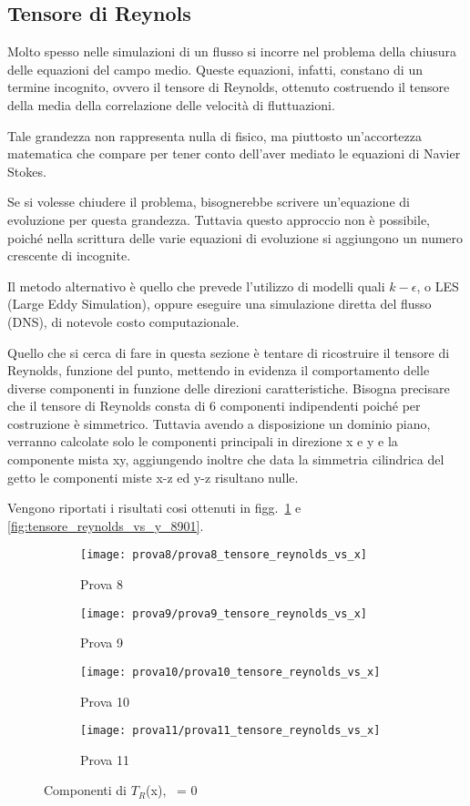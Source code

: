 \documentclass{article} %
\newcommand{\yd}{\nicefrac{\textrm{y}}{\textrm{D}}\ }
\begin{document}
\subsection{Tensore di Reynols}
Molto spesso nelle simulazioni di un flusso si incorre nel problema della chiusura delle equazioni del campo medio. Queste equazioni, infatti, constano di un termine incognito, ovvero il tensore di Reynolds, ottenuto costruendo il tensore della media della correlazione delle velocità di fluttuazioni.\par
Tale grandezza non rappresenta nulla di fisico, ma piuttosto un'accortezza matematica che compare per tener conto dell'aver mediato le equazioni di Navier Stokes.\par
Se si volesse chiudere il problema, bisognerebbe scrivere un'equazione di evoluzione per questa grandezza. Tuttavia questo approccio non è possibile, poiché nella scrittura delle varie equazioni di evoluzione si aggiungono un numero crescente di incognite.\par
Il metodo alternativo è quello che prevede l'utilizzo di modelli quali $k-\epsilon$, o LES (Large Eddy Simulation), oppure eseguire una simulazione diretta del flusso (DNS), di notevole costo computazionale.\par
Quello che si cerca di fare in questa sezione è tentare di ricostruire il tensore di Reynolds, funzione del punto, mettendo in evidenza il comportamento delle diverse componenti in funzione delle direzioni caratteristiche. Bisogna precisare che il tensore di Reynolds consta di 6 componenti indipendenti poiché per costruzione è simmetrico. Tuttavia avendo a disposizione un dominio piano, verranno calcolate solo le componenti principali in direzione x e y e la componente mista xy, aggiungendo inoltre che data la simmetria cilindrica del getto le componenti miste x-z ed y-z risultano nulle.\par
Vengono riportati i risultati cosi ottenuti in figg.~\ref{fig:tensore_reynolds_vs_x_8901} e \ref{fig:tensore_reynolds_vs_y_8901}.
\clearpage
\begin{figure}[h!]
	\centering
	\begin{subfigure}[b]{0.24\textwidth}
		\texttt{[image: prova8/prova8\_tensore\_reynolds\_vs\_x]}
		\caption{Prova 8}
	\end{subfigure}
	\begin{subfigure}[b]{0.24\textwidth}
		\texttt{[image: prova9/prova9\_tensore\_reynolds\_vs\_x]}
		\caption{Prova 9}
	\end{subfigure}
	\begin{subfigure}[b]{0.24\textwidth}
		\texttt{[image: prova10/prova10\_tensore\_reynolds\_vs\_x]}
		\caption{Prova 10}
	\end{subfigure}
	\begin{subfigure}[b]{0.24\textwidth}
		\texttt{[image: prova11/prova11\_tensore\_reynolds\_vs\_x]}
		\caption{Prova 11}
	\end{subfigure}
	\caption{Componenti di $T_R$(x), \yd= 0}
	\label{fig:tensore_reynolds_vs_x_8901}
\end{figure}
\end{document}
